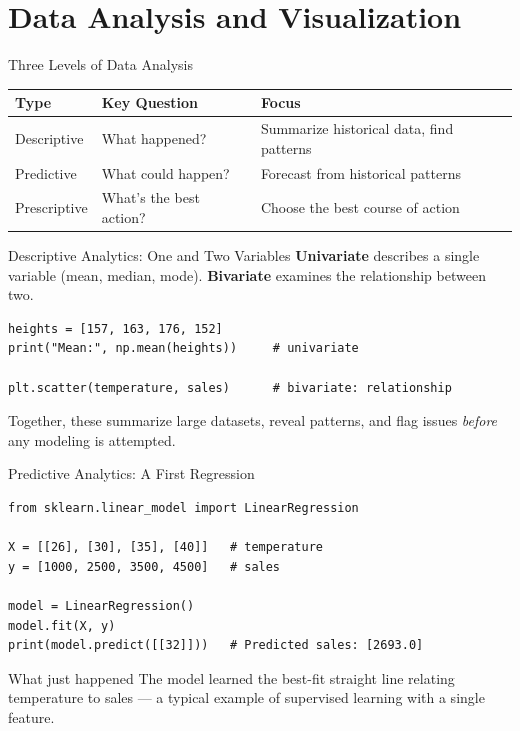 \documentclass[9pt,aspectratio=169,xcolor=table]{beamer}
\newcommand{\striped}{\rowcolors{1}{white}{stripe}}
\begin{document}
\section{Data Analysis and Visualization}

\begin{frame}{Three Levels of Data Analysis}
    \leavevmode
    \begin{table}
    \striped
    \small
    \begin{tabular}{p{2.1cm}p{3cm}p{5.5cm}}
        \toprule
        \textbf{Type} & \textbf{Key Question} & \textbf{Focus} \\
        \midrule
        Descriptive & What happened? & Summarize historical data, find patterns \\
        Predictive & What could happen? & Forecast from historical patterns \\
        Prescriptive & What's the best action? & Choose the best course of action \\
        \bottomrule
    \end{tabular}
    \end{table}
\end{frame}

\begin{frame}[fragile]{Descriptive Analytics: One and Two Variables}
    \leavevmode
    \small
    \textbf{Univariate} describes a single variable (mean, median, mode).
    \textbf{Bivariate} examines the relationship between two.

\begin{lstlisting}
heights = [157, 163, 176, 152]
print("Mean:", np.mean(heights))     # univariate

plt.scatter(temperature, sales)      # bivariate: relationship
\end{lstlisting}

    {\small Together, these summarize large datasets, reveal patterns,
    and flag issues \emph{before} any modeling is attempted.}
\end{frame}

\begin{frame}[fragile]{Predictive Analytics: A First Regression}
    \leavevmode
\begin{lstlisting}
from sklearn.linear_model import LinearRegression

X = [[26], [30], [35], [40]]   # temperature
y = [1000, 2500, 3500, 4500]   # sales

model = LinearRegression()
model.fit(X, y)
print(model.predict([[32]]))   # Predicted sales: [2693.0]
\end{lstlisting}

    \begin{block}{What just happened}
        \small The model learned the best-fit straight line relating
        temperature to sales --- a typical example of
        \alert{supervised learning} with a single feature.
    \end{block}
\end{frame}
\end{document}
